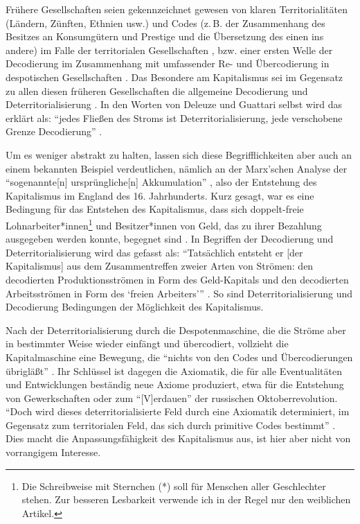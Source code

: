 \documentclass[12pt,
               paper=a4,
               twoside=false,
               onehalfspacing,
               bibliography=totoc,
               toc=graduated,
               ]{scrartcl}
\newcommand{\pc}[2]{\parencite[#1]{#2}}
\newcommand{\vgl}[2]{\parencite[vgl.][#1]{#2}}
\newcommand{\dg}{Deleuze und Guattari\xspace}
\begin{document}
Frühere Gesellschaften seien gekennzeichnet gewesen von klaren
Territorialitäten (Ländern, Zünften, Ethnien usw.) und Codes (z.\,B.
der Zusammenhang des Besitzes an Konsumgütern und Prestige und die
Übersetzung des einen ins andere) im Falle der territorialen
Gesellschaften \vgl{318, 332}{ao}, bzw. einer ersten Welle der
Decodierung im Zusammenhang mit umfassender Re- und Übercodierung in
despotischen Gesellschaften \vgl{337}{ao}. Das Besondere am
Kapitalismus sei im Gegensatz zu allen diesen früheren Gesellschaften
die allgemeine Decodierung und Deterritorialisierung \vgl{337}{ao}. In
den Worten von \dg selbst wird das erklärt als: "`jedes Fließen des
Stroms ist Deterritorialisierung, jede verschobene Grenze
Decodierung"' \pc{298}{ao}.

Um es weniger abstrakt zu halten, lassen sich diese Begrifflichkeiten
aber auch an einem bekannten Beispiel verdeutlichen, nämlich an der
Marx'schen Analyse der "`sogenannte[n] ursprüngliche[n] Akkumulation"'
\pc{741}{kap}, also der Entstehung des Kapitalismus im England des 16.
Jahrhunderts. Kurz gesagt, war es eine Bedingung für das Entstehen des
Kapitalismus, dass sich doppelt-freie Lohnarbeiter*innen\footnote{Die
Schreibweise mit Sternchen (*) soll für Menschen aller Geschlechter
stehen. Zur besseren Lesbarkeit verwende ich in der Regel nur den
weiblichen Artikel.} und Besitzer*innen von Geld, das zu ihrer
Bezahlung ausgegeben werden konnte, begegnet sind \vgl{742}{kap}. In
Begriffen der Decodierung und Deterritorialisierung wird das gefasst
als: \enquote{Tatsächlich entsteht er [der Kapitalismus] aus dem
Zusammentreffen zweier Arten von Strömen: den decodierten
Produktionsströmen in Form des Geld-Kapitals und den decodierten
Arbeitsströmen in Form des \enquote{freien Arbeiters}} \pc{44}{ao}. So
sind Deterritorialisierung und Decodierung Bedingungen der Möglichkeit
des Kapitalismus.

Nach der Deterritorialisierung durch die Despotenmaschine, die die
Ströme aber in bestimmter Weise wieder einfängt und übercodiert,
vollzieht die Kapitalmaschine eine Bewegung, die "`nichts von den
Codes und Übercodierungen übrigläßt"' \pc{337}{ao}. Ihr Schlüssel ist
dagegen die Axiomatik, die für alle Eventualitäten und Entwicklungen
beständig neue Axiome produziert, etwa für die Entstehung von
Gewerkschaften oder zum "`[V]erdauen"' \pc{326}{ao} der russischen
Oktoberrevolution. "`Doch wird dieses deterritorialisierte Feld durch
eine Axiomatik determiniert, im Gegensatz zum territorialen Feld, das
sich durch primitive Codes bestimmt"' \pc{322}{ao}. Dies macht die
Anpassungsfähigkeit des Kapitalismus aus, ist hier aber nicht von
vorrangigem Interesse.
\end{document}
